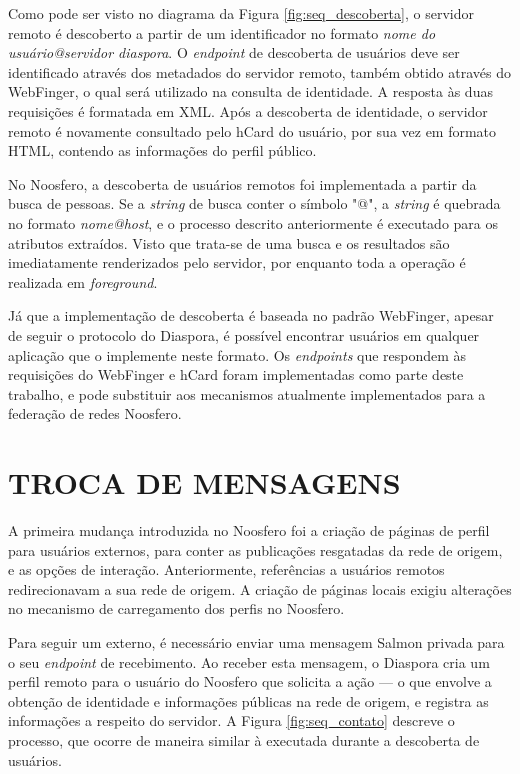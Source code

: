 Como pode ser visto no diagrama da Figura \ref{fig:seq_descoberta}, o servidor
remoto é descoberto a partir de um identificador no formato \textit{nome do
usuário@servidor diaspora}. O \textit{endpoint} de descoberta de usuários deve ser
identificado através dos metadados do servidor remoto, também obtido através do
WebFinger, o qual será utilizado na consulta de identidade. A resposta às duas
requisições é formatada em XML. Após a descoberta de identidade, o servidor remoto é
novamente consultado pelo hCard do usuário, por sua vez em formato HTML, contendo as
informações do perfil público.

No Noosfero, a descoberta de usuários remotos foi implementada a partir da busca de
pessoas. Se a \textit{string} de busca conter o símbolo "@", a \textit{string} é
quebrada no formato \textit{nome@host}, e o processo descrito anteriormente é
executado para os atributos extraídos. Visto que trata-se de uma busca e os
resultados são imediatamente renderizados pelo servidor, por enquanto toda a
operação é realizada em \textit{foreground}.

Já que a implementação de descoberta é baseada no padrão WebFinger, apesar de seguir
o protocolo do Diaspora, é possível encontrar usuários em qualquer aplicação que o
implemente neste formato. Os \textit{endpoints} que respondem às requisições do
WebFinger e hCard foram implementadas como parte deste trabalho, e pode substituir
aos mecanismos atualmente implementados para a federação de redes Noosfero.



\section{TROCA DE MENSAGENS}

A primeira mudança introduzida no Noosfero foi a criação de páginas de perfil para
usuários externos, para conter as publicações resgatadas da rede de origem, e as
opções de interação. Anteriormente, referências a usuários remotos redirecionavam a
sua rede de origem. A criação de páginas locais exigiu alterações no mecanismo de
carregamento dos perfis no Noosfero. 

Para seguir um externo, é necessário enviar uma mensagem Salmon privada para o seu
\textit{endpoint} de recebimento. Ao receber esta mensagem, o Diaspora cria um
perfil remoto para o usuário do Noosfero que solicita a ação --- o que envolve a
obtenção de identidade e informações públicas na rede de origem, e registra as
informações a respeito do servidor. A Figura \ref{fig:seq_contato} descreve o
processo, que ocorre de maneira similar à executada durante a descoberta de
usuários.

